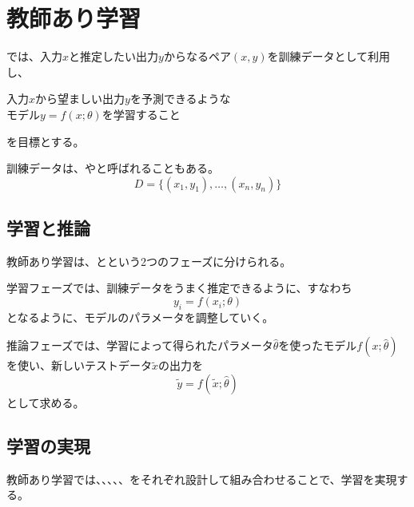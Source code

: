 \documentclass[../../../topic_machine-learning]{subfiles}
\begin{document}
\sectionline
\section{教師あり学習}

では、入力$x$と推定したい出力$y$からなるペア$(x,y)$を訓練データとして利用し、
\begin{emphabox}
  \begin{spacebox}
    \begin{center}
      入力$x$から望ましい出力$y$を予測できるような\\
      モデル$y = f(x; \theta)$を学習すること
    \end{center}
  \end{spacebox}
\end{emphabox}
を目標とする。

\br

訓練データは、やと呼ばれることもある。
\begin{equation*}
  D = \{ (x_1, y_1), \ldots, (x_n, y_n) \}
\end{equation*}

\subsection{学習と推論}

教師あり学習は、とという2つのフェーズに分けられる。

学習フェーズでは、訓練データをうまく推定できるように、すなわち
\begin{equation*}
  y_i = f(x_i; \theta)
\end{equation*}
となるように、モデルのパラメータを調整していく。

\br

推論フェーズでは、学習によって得られたパラメータ$\hat{\theta}$を使ったモデル$f(x;\hat{\theta})$を使い、新しいテストデータ$\tilde{x}$の出力を
\begin{equation*}
  \tilde{y} = f(\tilde{x}; \hat{\theta})
\end{equation*}
として求める。

\subsection{学習の実現}

教師あり学習では、、、、、をそれぞれ設計して組み合わせることで、学習を実現する。
\end{document}
